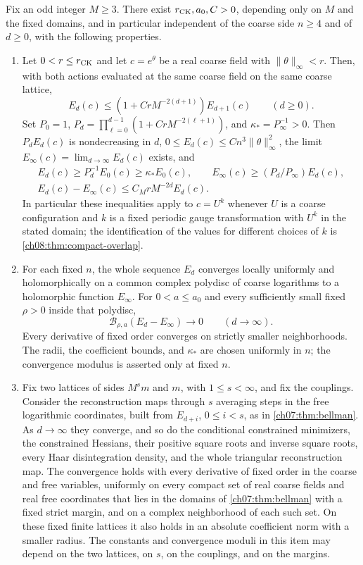 \begin{theorem}\label{ch08:thm:classical-cutoff}
Fix an odd integer $M\ge3$. There exist $r_{\rm CK},a_0,C>0$, depending only on $M$ and the fixed domains, and in particular independent of the coarse side $n\ge4$ and of $d\ge0$, with the following properties.
\begin{enumerate}
\item Let $0<r\le r_{\rm CK}$ and let $c=e^\theta$ be a real coarse field with $\|\theta\|_\infty<r$. Then, with both actions evaluated at the same coarse field on the same coarse lattice,
\[
 E_d(c)\le(1+CrM^{-2(d+1)})E_{d+1}(c)\qquad(d\ge0).
\]
Set $P_0=1$, $P_d=\prod_{\ell=0}^{d-1}(1+CrM^{-2(\ell+1)})$, and $\kappa_*=P_\infty^{-1}>0$. Then $P_dE_d(c)$ is nondecreasing in $d$, $0\le E_d(c)\le Cn^3\|\theta\|_\infty^2$, the limit $E_\infty(c)=\lim_{d\to\infty}E_d(c)$ exists, and
\[
 \begin{gathered}
 E_d(c)\ge P_d^{-1}E_0(c)\ge\kappa_*E_0(c),\qquad
 E_\infty(c)\ge(P_d/P_\infty)E_d(c),\\
 E_d(c)-E_\infty(c)\le C_MrM^{-2d}E_d(c).
 \end{gathered}
\]
In particular these inequalities apply to $c=U^k$ whenever $U$ is a coarse configuration and $k$ is a fixed periodic gauge transformation with $U^k$ in the stated domain; the identification of the values for different choices of $k$ is \cref{ch08:thm:compact-overlap}.
\item For each fixed $n$, the whole sequence $E_d$ converges locally uniformly and holomorphically on a common complex polydisc of coarse logarithms to a holomorphic function $E_\infty$. For $0<a\le a_0$ and every sufficiently small fixed $\rho>0$ inside that polydisc,
\[
 \mathcal B_{\rho,a}(E_d-E_\infty)\longrightarrow0\qquad(d\to\infty).
\]
Every derivative of fixed order converges on strictly smaller neighborhoods. The radii, the coefficient bounds, and $\kappa_*$ are chosen uniformly in $n$; the convergence modulus is asserted only at fixed $n$.
\item Fix two lattices of sides $M^sm$ and $m$, with $1\le s<\infty$, and fix the couplings. Consider the reconstruction maps through $s$ averaging steps in the free logarithmic coordinates, built from $E_{d+i}$, $0\le i<s$, as in \cref{ch07:thm:bellman}. As $d\to\infty$ they converge, and so do the conditional constrained minimizers, the constrained Hessians, their positive square roots and inverse square roots, every Haar disintegration density, and the whole triangular reconstruction map. The convergence holds with every derivative of fixed order in the coarse and free variables, uniformly on every compact set of real coarse fields and real free coordinates that lies in the domains of \cref{ch07:thm:bellman} with a fixed strict margin, and on a complex neighborhood of each such set. On these fixed finite lattices it also holds in an absolute coefficient norm with a smaller radius. The constants and convergence moduli in this item may depend on the two lattices, on $s$, on the couplings, and on the margins.
\end{enumerate}
\end{theorem}

